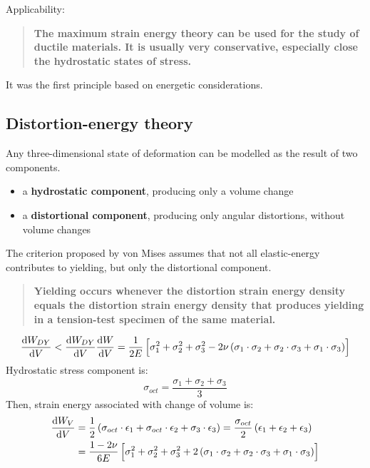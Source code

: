 \documentclass[class=report, crop=false, 12pt,a4paper]{standalone}
\begin{document}
Applicability:
\begin{quotation}
  \textbf{The maximum strain energy theory can be used for the study of ductile materials. It is usually very conservative, especially close the hydrostatic states of stress.}
\end{quotation}
It was the first principle based on energetic considerations.
\subsection{Distortion-energy theory}
Any three-dimensional state of deformation can be modelled as the result of two components.
\begin{itemize}
  \item a \textbf{hydrostatic component}, producing only a volume change
  \item a \textbf{distortional component}, producing only angular distortions, without volume changes
\end{itemize}
The criterion proposed by von Mises assumes that not all elastic-energy contributes to yielding, but only the distortional component.
\begin{quotation}
  \textbf{Yielding occurs whenever the distortion strain energy density equals the distortion strain energy density that produces yielding in a tension-test specimen of the same material.}
\end{quotation}
\begin{gather}
  \frac{\dif W_{DY}}{\dif V} < \frac{\dif W_{DY}}{\dif V}
  \frac{\dif W}{\dif V} = \frac{1}{2E} \left[ \sigma_1^2 + \sigma_2^2 + \sigma_3^2 - 2\nu \left( \sigma_1 \cdot \sigma_2 + \sigma_2 \cdot \sigma_3 + \sigma_1 \cdot \sigma_3 \right) \right]
\end{gather}
Hydrostatic stress component is:
\begin{equation}
  \sigma_{oct} = \frac{\sigma_1 + \sigma_2 + \sigma_3}{3}
\end{equation}
Then, strain energy associated with change of volume is:
\begin{align}
  \frac{\dif W_V}{\dif V} &= \frac{1}{2} \left( \sigma_{oct} \cdot \epsilon_1 + \sigma_{oct} \cdot \epsilon_2 + \sigma_3 \cdot \epsilon_3\right) = \frac{\sigma_{oct}}{2} \left(\epsilon_1 + \epsilon_2 + \epsilon_3\right)\\
  &= \frac{1 - 2\nu}{6E} \left[\sigma_1^2 + \sigma_2^2 + \sigma_3^2 + 2 \left(\sigma_1\cdot\sigma_2 + \sigma_2\cdot\sigma_3 + \sigma_1\cdot\sigma_3\right)\right]
\end{align}
\end{document}
